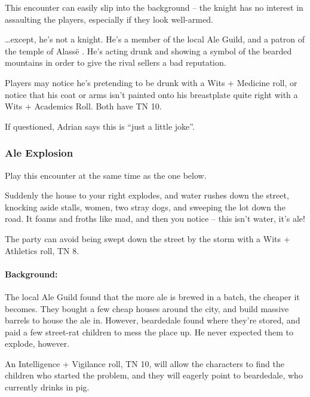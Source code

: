 This encounter can easily slip into the background -- the knight has no interest in assaulting the players, especially if they look well-armed.

\ldots except, he's not a knight.  He's a member of the local Ale Guild, and a patron of the temple of Alass\"e .   He's acting drunk and showing a symbol of the bearded mountains in order to give the rival sellers a bad reputation.

Players may notice he's pretending to be drunk with a Wits + Medicine roll, or notice that his coat or arms isn't painted onto his breastplate quite right with a Wits + Academics Roll.  Both have TN 10.



If questioned, Adrian says this is ``just a little joke''.

\subsubsection{Ale Explosion}

Play this encounter at the same time as the one below.

\begin{boxtext}
	Suddenly the house to your right explodes, and water rushes down the street, knocking aside stalls, women, two stray dogs, and sweeping the lot down the road.  It foams and froths like mad, and then you notice -- this isn't water, it's ale!
\end{boxtext}

The party can avoid being swept down the street by the storm with a Wits + Athletics roll, TN 8.

\paragraph{Background:} The local Ale Guild found that the more ale is brewed in a batch, the cheaper it becomes.  They bought a few cheap houses around the city, and build massive barrels to house the ale in.  However, \gls{beardedale} found where they're stored, and paid a few street-rat children to mess the place up.  He never expected them to explode, however.

An Intelligence + Vigilance roll, TN 10, will allow the characters to find the children who started the problem, and they will eagerly point to \gls{beardedale}, who currently drinks in \gls{pig}.


